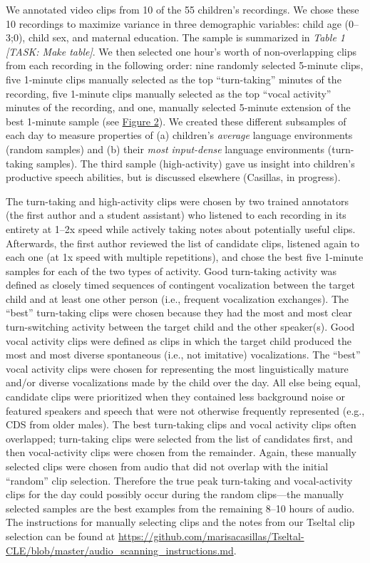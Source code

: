 \documentclass[floatsintext,man]{apa6}
\theoremstyle{definition}
\theoremstyle{definition}
\theoremstyle{definition}
\theoremstyle{remark}
\begin{document}
We annotated video clips from 10 of the 55 children's recordings. We
chose these 10 recordings to maximize variance in three demographic
variables: child age (0--3;0), child sex, and maternal education. The
sample is summarized in \emph{Table 1} \emph{{[}TASK: Make table{]}}. We
then selected one hour's worth of non-overlapping clips from each
recording in the following order: nine randomly selected 5-minute clips,
five 1-minute clips manually selected as the top \enquote{turn-taking}
minutes of the recording, five 1-minute clips manually selected as the
top \enquote{vocal activity} minutes of the recording, and one, manually
selected 5-minute extension of the best 1-minute sample (see
\protect\hyperlink{fig2}{Figure 2}). We created these different
subsamples of each day to measure properties of (a) children's
\emph{average} language environments (random samples) and (b) their
\emph{most input-dense} language environments (turn-taking samples). The
third sample (high-activity) gave us insight into children's productive
speech abilities, but is discussed elsewhere (Casillas, in progress).

The turn-taking and high-activity clips were chosen by two trained
annotators (the first author and a student assistant) who listened to
each recording in its entirety at 1--2x speed while actively taking
notes about potentially useful clips. Afterwards, the first author
reviewed the list of candidate clips, listened again to each one (at 1x
speed with multiple repetitions), and chose the best five 1-minute
samples for each of the two types of activity. Good turn-taking activity
was defined as closely timed sequences of contingent vocalization
between the target child and at least one other person (i.e., frequent
vocalization exchanges). The \enquote{best} turn-taking clips were
chosen because they had the most and most clear turn-switching activity
between the target child and the other speaker(s). Good vocal activity
clips were defined as clips in which the target child produced the most
and most diverse spontaneous (i.e., not imitative) vocalizations. The
\enquote{best} vocal activity clips were chosen for representing the
most linguistically mature and/or diverse vocalizations made by the
child over the day. All else being equal, candidate clips were
prioritized when they contained less background noise or featured
speakers and speech that were not otherwise frequently represented
(e.g., CDS from older males). The best turn-taking clips and vocal
activity clips often overlapped; turn-taking clips were selected from
the list of candidates first, and then vocal-activity clips were chosen
from the remainder. Again, these manually selected clips were chosen
from audio that did not overlap with the initial \enquote{random} clip
selection. Therefore the true peak turn-taking and vocal-activity clips
for the day could possibly occur during the random clips---the manually
selected samples are the best examples from the remaining 8--10 hours of
audio. The instructions for manually selecting clips and the notes from
our Tseltal clip selection can be found at
\url{https://github.com/marisacasillas/Tseltal-CLE/blob/master/audio_scanning_instructions.md}.
\end{document}
